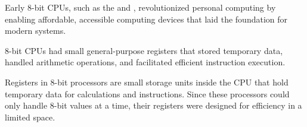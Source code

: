 \begin{NxSSSBox}
	\begin{NxIDBox}
		Early 8-bit CPUs, such as the  and , revolutionized personal computing by enabling affordable, accessible computing devices that laid the foundation for modern systems.
	\end{NxIDBox}
	\begin{NxIDBoxL}
		 8-bit CPUs had small general-purpose registers that stored temporary data, handled arithmetic operations, and facilitated efficient instruction execution.
	\end{NxIDBoxL}
\end{NxSSSBox}


\begin{NxSSSSBox}
	\begin{NxIDBox}
		Registers in 8-bit processors are small storage units inside the CPU that hold temporary data for calculations and instructions. Since these processors could only handle 8-bit values at a time, their registers were designed for efficiency in a limited space.
	\end{NxIDBox}
\end{NxSSSSBox}


